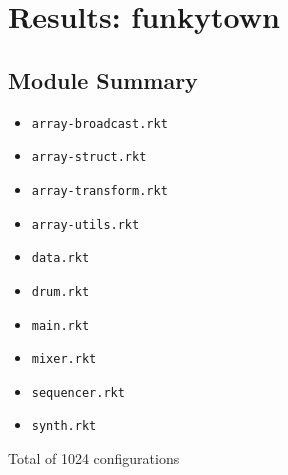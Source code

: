 \documentclass{article}
\newcommand{\mono}[1]{\texttt{#1}}
\begin{document}
\section{Results: funkytown}

\subsection{Module Summary}
\begin{itemize}
\item \mono{array-broadcast.rkt}
\item \mono{array-struct.rkt}
\item \mono{array-transform.rkt}
\item \mono{array-utils.rkt}
\item \mono{data.rkt}
\item \mono{drum.rkt}
\item \mono{main.rkt}
\item \mono{mixer.rkt}
\item \mono{sequencer.rkt}
\item \mono{synth.rkt}\end{itemize}
Total of 1024 configurations
\end{document}
